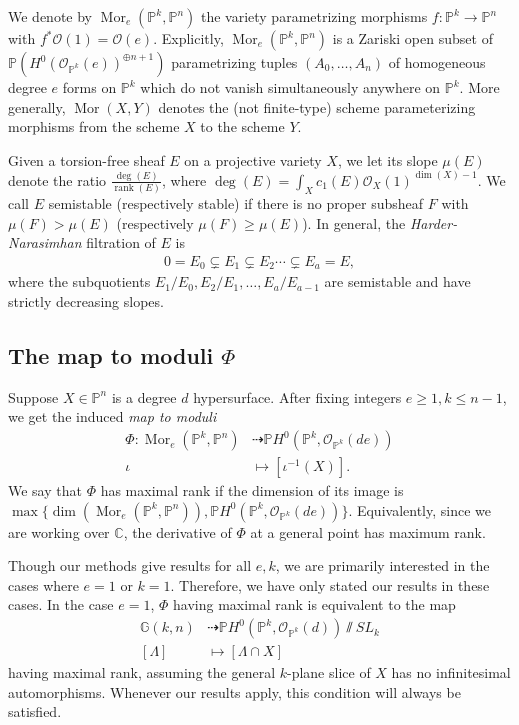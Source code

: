 \documentclass[11pt,reqno]{amsart}
\theoremstyle{plain}
\theoremstyle{definition}
\theoremstyle{remark}
\numberwithin{equation}{section}
\renewcommand{\to}{{\longrightarrow}}
\numberwithin{equation}{section}
\newcommand{\OO}{\mathscr{O}}
\newcommand{\PP}{\mathbb{P}}
\DeclareMathOperator{\Mor}{Mor}
\newcommand{\git}{\sslash}
\begin{document}
We denote by $\Mor_{e}(\PP^{k},\PP^{n})$ the variety parametrizing morphisms $f: \PP^{k} \to \PP^{n}$ with $f^{*}\OO(1) = \OO(e)$.  Explicitly, $\Mor_{e}(\PP^{k},\PP^{n})$ is a Zariski open subset of $\PP(H^{0}(\OO_{\PP^{k}}(e))^{\oplus n+1})$ parametrizing tuples $(A_{0}, \dots, A_{n})$ of homogeneous degree $e$ forms on $\PP^{k}$ which do not vanish simultaneously anywhere on $\PP^{k}$. More generally, $\Mor(X,Y)$ denotes the (not finite-type) scheme parameterizing morphisms from the scheme $X$ to the scheme $Y$.

Given a torsion-free sheaf $E$ on a projective variety $X$, we let its slope $\mu(E)$ denote the ratio $\frac{\deg(E)}{\operatorname{rank}(E)}$, where $\deg(E) = \int_{X}c_1(E)\OO_X(1)^{\dim(X)-1}$. We call $E$ semistable (respectively stable) if there is no proper subsheaf $F$ with $\mu(F)>\mu(E)$ (respectively $\mu(F)\geq \mu(E)$). In general, the \emph{Harder-Narasimhan} filtration of $E$ is
\begin{align*}
    0=E_0\subsetneq E_1\subsetneq E_2\cdots \subsetneq E_a=E,
\end{align*}
where the subquotients $E_1/E_0,E_2/E_1,\ldots,E_a/E_{a-1}$ are semistable and have strictly decreasing slopes.

\subsection{The map to moduli $\Phi$}\label{subsection:maptomoduli}
Suppose $X \in \PP^{n}$ is a degree $d$ hypersurface.  After fixing integers $e \geq 1, k \leq n-1$, we get the induced {\sl map to moduli}
\begin{align*}
    \Phi: \operatorname{Mor}_e(\PP^k,\PP^n)&\dashrightarrow \PP H^0(\PP^k,\OO_{\PP^k}(de))\\
    \iota &\mapsto [\iota^{-1}(X)].
\end{align*}
We say that $\Phi$ has maximal rank  if the dimension of its image is $\max\{\dim(\operatorname{Mor}_e(\PP^k,\PP^n)),\PP H^0(\PP^k,\OO_{\PP^k}(de))\}$. Equivalently, since we are working over $\mathbb{C}$, the derivative of $\Phi$ at a general point has maximum rank.

Though our methods give results for all $e,k$, we are primarily interested in the cases where $e=1$ or $k=1$.  Therefore, we have only stated our results in these cases. In the case $e=1$, $\Phi$ having maximal rank is equivalent to the map
\begin{align*}
    \mathbb{G}(k,n)&\dashrightarrow \PP H^0(\PP^k,\OO_{\PP^k}(d))\git SL_k\\
    [\Lambda]&\mapsto [\Lambda\cap X]
\end{align*}
having maximal rank, assuming the general $k$-plane slice of $X$ has no infinitesimal automorphisms. Whenever our results apply, this condition will always be satisfied.
\end{document}
